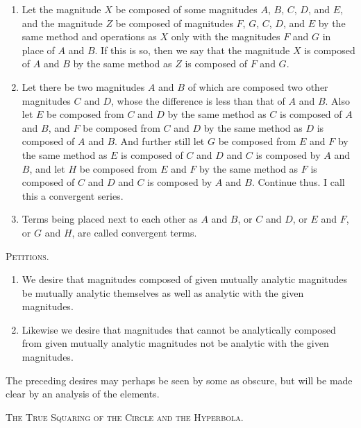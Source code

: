 \documentclass[11pt,letterpaper]{book}
\begin{document}
\begin{enumerate}
  \item Let the magnitude $X$ be composed of some magnitudes $A$, $B$, $C$, $D$,
  and $E$, and the magnitude $Z$ be composed of magnitudes $F$, $G$, $C$, $D$,
  and $E$ by the same method and operations as $X$ only with the magnitudes $F$
  and $G$ in place of $A$ and $B$. If this is so, then we say that the magnitude
  $X$ is composed of $A$ and $B$ by the same method as $Z$ is composed of $F$
  and $G$.
  
  \item Let there be two magnitudes $A$ and $B$ of which are composed two other
  magnitudes $C$ and $D$, whose the difference is less than that of $A$ and $B$.
  Also let $E$ be composed from $C$ and $D$ by the same method as $C$ is
  composed of $A$ and $B$, and $F$ be composed from $C$ and $D$ by the same
  method as $D$ is composed of $A$ and $B$. And further still let $G$ be
  composed from $E$ and $F$ by the same method as $E$ is composed of $C$ and $D$
  and $C$ is composed by $A$ and $B$, and let $H$ be composed from $E$ and $F$
  by the same method as $F$ is composed of $C$ and $D$ and $C$ is composed by
  $A$ and $B$. Continue thus. I call this a convergent series.
  
  \item Terms being placed next to each other as $A$ and $B$, or $C$ and $D$,
  or $E$ and $F$, or $G$ and $H$, are called convergent terms.
\end{enumerate}

\begin{center}
\Large\textsc{Petitions.}
\end{center}
\begin{enumerate}
  \item We desire that magnitudes composed of given mutually analytic
  magnitudes be mutually analytic themselves as well as analytic with the given
  magnitudes.
  
  \item Likewise we desire that magnitudes that cannot be analytically
  composed from given mutually analytic magnitudes not be analytic with the
  given magnitudes.
\end{enumerate}
The preceding desires may perhaps be seen by some as obscure, but will be made
clear by an analysis of the elements.

\cleardoublepage
\begin{center}
\Huge\textsc{The True Squaring of the Circle and the Hyperbola.}
\end{center}
\end{document}
